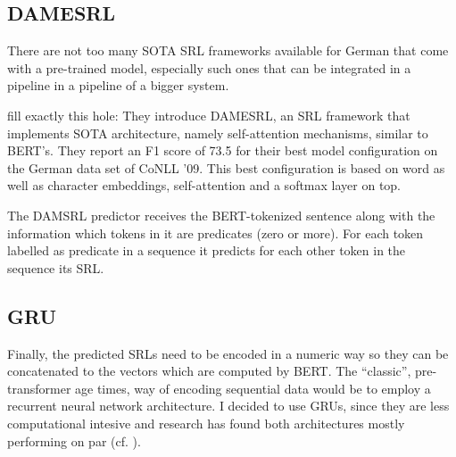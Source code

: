 

\subsection{DAMESRL}

There are not too many SOTA SRL frameworks available for German that come with a pre-trained model,
especially such ones that can be integrated in a pipeline in a pipeline of a bigger system.

\cite{do2018flexible} fill exactly this hole: They introduce DAMESRL, an SRL framework that
implements SOTA architecture, namely self-attention mechanisms, similar to BERT's. They report
an F1 score of 73.5 for their best model configuration on the German data set of CoNLL '09.
This best configuration is based on word as well as character embeddings, self-attention and a
softmax layer on top.

The DAMSRL predictor receives the BERT-tokenized sentence along with the information which tokens
in it are predicates (zero or more). For each token labelled as predicate in a sequence it predicts
for each other token in the sequence its SRL.

\subsection{GRU}

Finally, the predicted SRLs need to be encoded in a numeric way so they can be concatenated
to the vectors which are computed by BERT. The ``classic'', pre-transformer age times, way
of encoding sequential data would be to employ a recurrent neural network architecture.
I decided to use GRUs, since they are less computational intesive and research has found
both architectures mostly performing on par (cf. \cite{chung2014empirical}).


